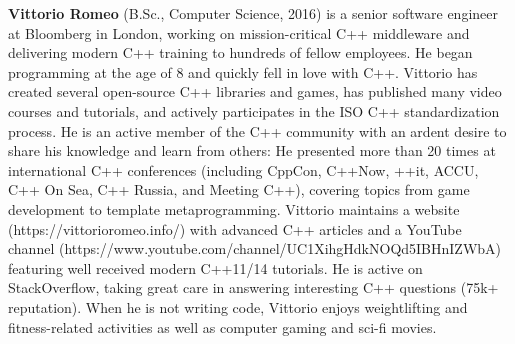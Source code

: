 \vspace*{18pt} %
\noindent \textbf{Vittorio Romeo}  (B.Sc., Computer Science, 2016) is a senior software engineer at Bloomberg in London, working on mission-critical C++ middleware and delivering modern C++ training to hundreds of fellow employees. He began programming at the age of 8 and quickly fell in love with C++. Vittorio has created several open-source C++ libraries and games, has published many video courses and tutorials, and actively participates in the ISO C++ standardization process. He is an active member of the C++ community with an ardent desire to share his knowledge and learn from others: He presented more than 20 times at international C++ conferences (including CppCon, C++Now, ++it, ACCU, C++ On Sea, C++ Russia, and Meeting C++), covering topics from game development to template metaprogramming. Vittorio maintains a website (https://vittorioromeo.info/) with advanced C++ articles and a YouTube channel (https://www.youtube.com/channel/UC1XihgHdkNOQd5IBHnIZWbA) featuring well received modern C++11/14 tutorials. He is active on StackOverflow, taking great care in answering interesting C++ questions (75k+ reputation). When he is not writing code, Vittorio enjoys weightlifting and fitness-related activities as well as computer gaming and sci-fi movies.
